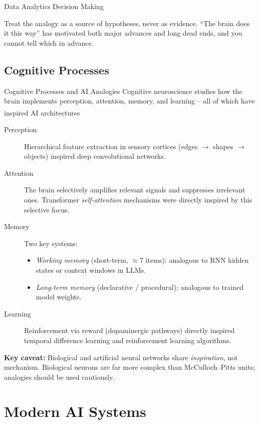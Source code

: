 \begin{v3topic}{Data Analytics Decision Making}
\begin{cautionbox}
Treat the analogy as a source of hypotheses, never as evidence. ``The brain
does it this way'' has motivated both major advances and long dead ends, and
you cannot tell which in advance.
\end{cautionbox}

    \subsection{Cognitive Processes}

\begin{v3topic}{Cognitive Processes and AI Analogies}
        Cognitive neuroscience studies how the brain implements perception, attention, memory, and learning -- all of which have inspired AI architectures\textsuperscript{\cite[][p.~13]{Kriesel2007NeuralNetworks}}

        \begin{description}
            \item[Perception] Hierarchical feature extraction in sensory cortices (edges $\to$ shapes $\to$ objects) inspired deep convolutional networks.
            \item[Attention] The brain selectively amplifies relevant signals and suppresses irrelevant ones. Transformer \emph{self-attention} mechanisms were directly inspired by this selective focus.
            \item[Memory] Two key systems:
                \begin{itemize}
                    \item \emph{Working memory} (short-term, $\approx$7 items): analogous to RNN hidden states or context windows in LLMs.
                    \item \emph{Long-term memory} (declarative / procedural): analogous to trained model weights.
                \end{itemize}
            \item[Learning] Reinforcement via reward (dopaminergic pathways) directly inspired temporal difference learning and reinforcement learning algorithms.
        \end{description}

        \textbf{Key caveat:} Biological and artificial neural networks share \emph{inspiration}, not mechanism. Biological neurons are far more complex than McCulloch--Pitts units; analogies should be used cautiously.
\end{v3topic}

    \section{Modern AI Systems}

\end{v3topic}
